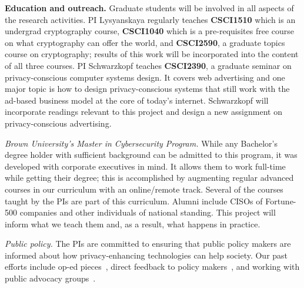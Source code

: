 \noindent\textbf{Education and outreach.} Graduate students will be involved in all aspects of the research activities.  PI Lysyanskaya
regularly teaches \textbf{CSCI1510} which is an undergrad cryptography course, \textbf{CSCI1040} which is a pre-requisites free course on what cryptography can offer the world, and \textbf{CSCI2590}, a graduate topics course on cryptography; results of this work will be incorporated into the content of all three courses.
%
PI Schwarzkopf teaches \textbf{CSCI2390}, a graduate seminar on privacy-conscious computer systems design. It covers web advertising and one major topic is how to design privacy-conscious systems that still work with the ad-based business model at the core of today's internet. Schwarzkopf will incorporate readings relevant to this project and design a new assignment on privacy-conscious advertising.
%

\noindent\textit{Brown University's Master in Cybersecurity Program.} While any Bachelor's degree holder with sufficient background can be admitted to this program, it was 
developed with corporate executives in mind. It allows them to work full-time while getting their degree; this is accomplished by augmenting regular advanced courses in our curriculum with an online/remote track.  Several of the courses taught by the PIs are part of this curriculum.  Alumni include CISOs of Fortune-500 companies and other individuals of national standing.  
This project will inform what we teach them and, as a result, what happens in practice.

\noindent\textit{Public policy.} The PIs are committed to ensuring that public policy makers are informed about how privacy-enhancing technologies can help society.  Our past efforts include op-ed pieces~\cite{projo1,csm,projo2}, direct feedback to policy makers~\cite{annacdt}, and working with public advocacy groups~\cite{epic15}.
